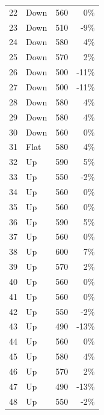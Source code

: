 \documentclass{scrartcl}
\begin{document}
\begin{longtable}{|r|l|r|r|}
		22    & Down  & 560   & 0\%     \\
		23    & Down  & 510   & \cellcolor[rgb]{ 1,  .922,  .612}\textcolor[rgb]{ .612,  .341,  0}{-9\%}   \\
		24    & Down  & 580   & 4\%     \\
		25    & Down  & 570   & 2\%     \\
		26    & Down  & 500   & \cellcolor[rgb]{ 1,  .78,  .808}\textcolor[rgb]{ .612,  0,  .024}{-11\%}  \\
		27    & Down  & 500   & \cellcolor[rgb]{ 1,  .78,  .808}\textcolor[rgb]{ .612,  0,  .024}{-11\%}  \\
		28    & Down  & 580   & 4\%     \\
		29    & Down  & 580   & 4\%     \\
		30    & Down  & 560   & 0\%     \\
		31    & Flat  & 580   & 4\%     \\
		32    & Up    & 590   & \cellcolor[rgb]{ 1,  .922,  .612}\textcolor[rgb]{ .612,  .341,  0}{5\%}  \\
		33    & Up    & 550   & -2\%    \\
		34    & Up    & 560   & 0\%     \\
		35    & Up    & 560   & 0\%     \\
		36    & Up    & 590   & \cellcolor[rgb]{ 1,  .922,  .612}\textcolor[rgb]{ .612,  .341,  0}{5\%}  \\
		37    & Up    & 560   & 0\%     \\
		38    & Up    & 600   & \cellcolor[rgb]{ 1,  .922,  .612}\textcolor[rgb]{ .612,  .341,  0}{7\%}  \\
		39    & Up    & 570   & 2\%     \\
		40    & Up    & 560   & 0\%     \\
		41    & Up    & 560   & 0\%     \\
		42    & Up    & 550   & -2\%    \\
		43    & Up    & 490   & \cellcolor[rgb]{ 1,  .78,  .808}\textcolor[rgb]{ .612,  0,  .024}{-13\%}  \\
		44    & Up    & 560   & 0\%     \\
		45    & Up    & 580   & 4\%     \\
		46    & Up    & 570   & 2\%     \\
		47    & Up    & 490   & \cellcolor[rgb]{ 1,  .78,  .808}\textcolor[rgb]{ .612,  0,  .024}{-13\%}  \\
		48    & Up    & 550   & -2\%    \\

\end{longtable}
\end{document}
